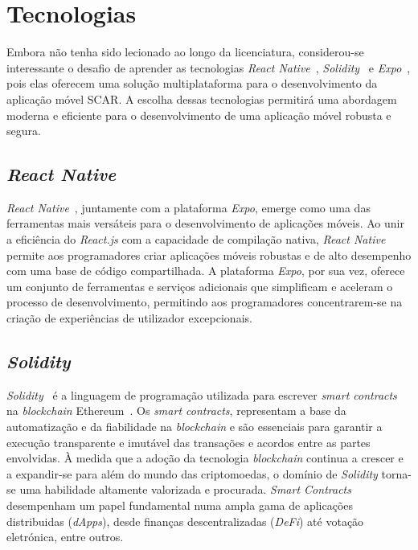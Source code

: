 \documentclass[10pt]{article}
\begin{document}
\section*{Tecnologias}

Embora não tenha sido lecionado ao longo da licenciatura, considerou-se interessante o desafio de aprender
as tecnologias \textit{React Native}~\cite{ReactNativeBook}, \textit{Solidity}~\cite{SolidityBook} e \textit{Expo}~\cite{Expo}, pois elas oferecem uma solução multiplataforma para o
desenvolvimento da aplicação móvel SCAR. A escolha dessas tecnologias permitirá uma abordagem moderna e
eficiente para o desenvolvimento de uma aplicação móvel robusta e segura.

\subsection*{\textit{React Native}}

\textit{React Native}~\cite{ReactNativeDocs}, juntamente com a plataforma \textit{Expo}, emerge como uma das ferramentas mais versáteis
para o desenvolvimento de aplicações móveis. Ao unir a eficiência do \textit{React.js} com a capacidade de compilação
nativa, \textit{React Native} permite aos programadores criar aplicações móveis robustas e de alto desempenho
com uma base de código compartilhada. A plataforma \textit{Expo}, por sua vez, oferece um conjunto de ferramentas
e serviços adicionais que simplificam e aceleram o processo de desenvolvimento, permitindo aos programadores
concentrarem-se na criação de experiências de utilizador excepcionais.

\subsection*{\textit{Solidity}}

\textit{Solidity}~\cite{SolidityDocs} é a linguagem de programação utilizada para escrever \textit{smart contracts} na \textit{blockchain} Ethereum~\cite{Ethereum}.
Os \textit{smart contracts}, representam a base da automatização e da fiabilidade na \textit{blockchain} e são essenciais
para garantir a execução transparente e imutável das transações e acordos entre as partes envolvidas.
À medida que a adoção da tecnologia \textit{blockchain} continua a crescer e a expandir-se para além do mundo das criptomoedas, o domínio de \textit{Solidity} torna-se
uma habilidade altamente valorizada e procurada. \textit{Smart Contracts} desempenham um papel fundamental numa
ampla gama de aplicações distribuidas (\textit{dApps}), desde finanças descentralizadas (\textit{DeFi}) até votação eletrónica, entre outros.
\end{document}
